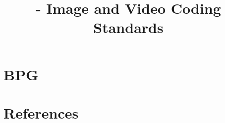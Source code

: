 
\title{\SM{} - Image and Video Coding Standards}

\maketitle

\tableofcontents

\section{BPG}

\section{References}

\renewcommand{\addcontentsline}[3]{}%

